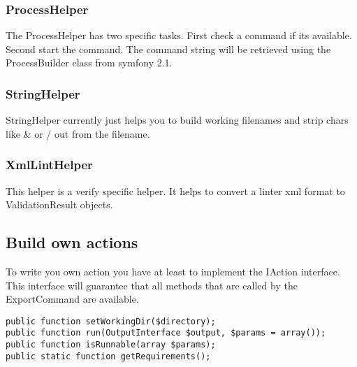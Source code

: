 \subsubsection{ProcessHelper}
The ProcessHelper has two specific tasks. First check a command if its available. Second start the command. The command string will be retrieved using the ProcessBuilder class from symfony 2.1.

\subsubsection{StringHelper}
StringHelper currently just helps you to build working filenames and strip chars like \& or / out from the filename.

\subsubsection{XmlLintHelper}
This helper is a verify specific helper. It helps to convert a linter xml format to ValidationResult objects.

\subsection{Build own actions}
To write you own action you have at least to implement the IAction interface. This interface will guarantee that all methods that are called by the ExportCommand are available.

\begin{verbatim}
public function setWorkingDir($directory);
public function run(OutputInterface $output, $params = array());
public function isRunnable(array $params);
public static function getRequirements();
\end{verbatim}

